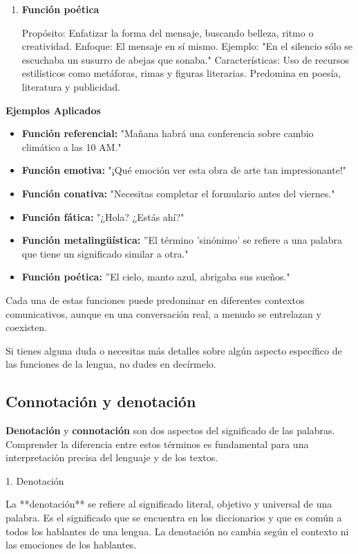 \begin{enumerate}
   \item \textbf{Función poética}
   
   Propósito: Enfatizar la forma del mensaje, buscando belleza, ritmo o creatividad.
   Enfoque: El mensaje en sí mismo.
   Ejemplo: "En el silencio sólo se escuchaba un susurro de abejas que sonaba."
   Características: Uso de recursos estilísticos como metáforas, rimas y figuras literarias. Predomina en poesía, literatura y publicidad.
\end{enumerate}


\textbf{Ejemplos Aplicados}
\begin{itemize}
   \item \textbf{Función referencial:} "Mañana habrá una conferencia sobre cambio climático a las 10 AM."
   \item \textbf{Función emotiva:} "¡Qué emoción ver esta obra de arte tan impresionante!"
   \item \textbf{Función conativa:} "Necesitas completar el formulario antes del viernes."
   \item \textbf{Función fática:} "¿Hola? ¿Estás ahí?"
   \item \textbf{Función metalingüística:} ''El término 'sinónimo' se refiere a una palabra que tiene un significado similar a otra."
   \item \textbf{Función poética:} ''El cielo, manto azul, abrigaba sus sueños."
\end{itemize}

Cada una de estas funciones puede predominar en diferentes contextos comunicativos, aunque en una conversación real, a menudo se entrelazan y coexisten.

Si tienes alguna duda o necesitas más detalles sobre algún aspecto específico de las funciones de la lengua, no dudes en decírmelo.

\subsection{Connotación y denotación}

\textbf{Denotación} y \textbf{connotación} son dos aspectos del significado de las palabras. Comprender la diferencia entre estos términos es fundamental para una interpretación precisa del lenguaje y de los textos.

 1. Denotación

La **denotación** se refiere al significado literal, objetivo y universal de una palabra. Es el significado que se encuentra en los diccionarios y que es común a todos los hablantes de una lengua. La denotación no cambia según el contexto ni las emociones de los hablantes.

